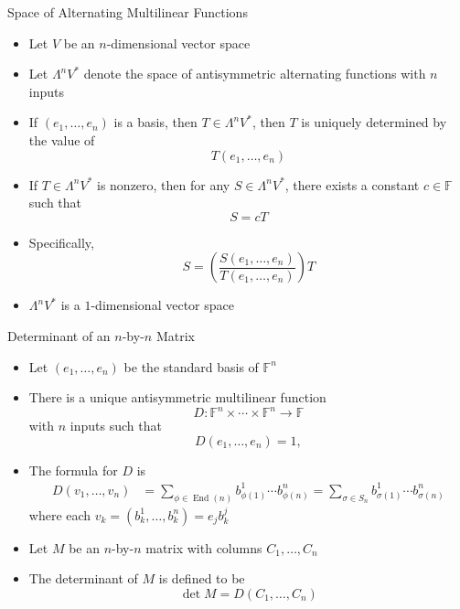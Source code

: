 \documentclass[usenames,dvipsnames,10pt]{beamer}
\newcommand\F{\mathbb{F}}
\newcommand{\End}{\operatorname{End}}
\begin{document}
\begin{frame}
  {Space of Alternating Multilinear Functions}

  \begin{itemize}
  \item Let $V$ be an $n$-dimensional vector space
  \item Let $\Lambda^nV^*$ denote the space of antisymmetric alternating functions with $n$ inputs
  \item If $(e_1, \dots, e_n)$ is a basis, then $T \in \Lambda^nV^*$, then $T$ is uniquely determined by the value of
    \[
      T(e_1, \dots, e_n)
    \]
  \item If $T \in \Lambda^nV^*$ is nonzero, then for any $S \in \Lambda^nV^*$, there exists a constant $c \in \F$ such that
    \[
      S = cT
    \]
  \item Specifically,
    \[
      S = \left(\frac{S(e_1, \dots, e_n)}{T(e_1, \dots, e_n)}\right)T
    \]
  \item $\Lambda^nV^*$ is a $1$-dimensional vector space
  \end{itemize}
\end{frame}

\begin{frame}
  {Determinant of an $n$-by-$n$ Matrix}

  \begin{itemize}
  \item Let $(e_1, \dots, e_n)$ be the standard basis of $\F^n$
  \item There is a unique antisymmetric multilinear function
    \[ D: \F^n \times\cdots \times \F^n \rightarrow \F \]
    with $n$ inputs such that
    \[ D(e_1, \dots, e_n) = 1, \]
  \item The formula for $D$ is
    \begin{align*}
      D(v_1, \dots, v_n) &=\sum_{\phi\in\End(n)} b^1_{\phi(1)}\cdots b^n_{\phi(n)}
                           = \sum_{\sigma\in S_n} b^1_{\sigma(1)}\cdots b^n_{\sigma(n)}
    \end{align*}
    where each $v_k = (b_k^1, \dots, b_k^n) = e_jb^j_k$
  \item Let $M$ be an $n$-by-$n$ matrix with columns $C_1, \dots, C_n$
  \item The determinant of $M$ is defined to be
    \[
      \det M = D(C_1, \dots, C_n)
    \]
  \end{itemize}
\end{frame}
\end{document}
